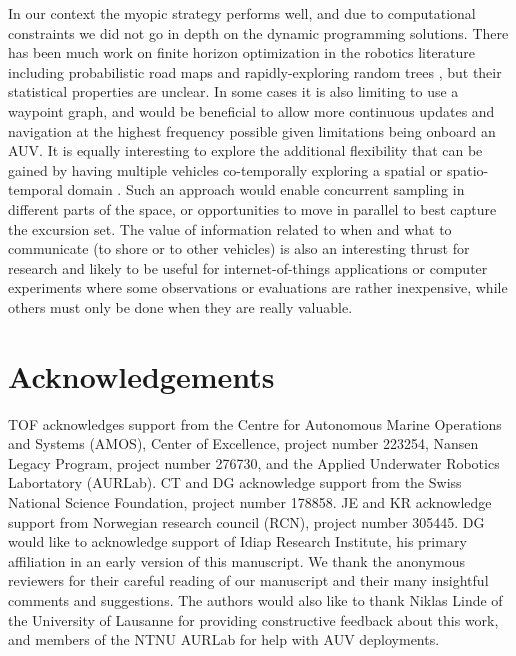 \documentclass[aoas]{imsart}
\begin{document}
In our context the myopic strategy performs well, and due to
computational constraints we did not go in depth on the dynamic
programming solutions. There has been much work on finite horizon
optimization in the robotics literature including probabilistic road
maps and rapidly-exploring random trees \citep{karaman2011sampling},
but their statistical properties are unclear.  In some cases it is
also limiting to use a waypoint graph, and would be beneficial to
allow more continuous updates and navigation at the highest frequency
possible given limitations being onboard an AUV.  It is equally
interesting to explore the additional flexibility that can be gained
by having multiple vehicles co-temporally exploring a spatial or
spatio-temporal domain \citep{ferreira2019advancing}. Such an approach
would enable concurrent sampling in different parts of the space, or
opportunities to move in parallel to best capture the excursion set.
The value of information related to when and what to communicate (to
shore or to other vehicles) is also an interesting thrust for research
and likely to be useful for internet-of-things applications or
computer experiments where some observations or evaluations are rather
inexpensive, while others must only be done when they are really
valuable.


\section*{Acknowledgements}

TOF acknowledges support from the Centre for Autonomous Marine
Operations and Systems (AMOS), Center of Excellence, project number
223254, Nansen Legacy Program, project number 276730, and the Applied
Underwater Robotics Labortatory (AURLab). CT and DG acknowledge
support from the Swiss National Science Foundation, project number
178858. JE and KR acknowledge support from Norwegian research council
(RCN), project number 305445. DG would like to acknowledge support of
Idiap Research Institute, his primary affiliation in an early version
of this manuscript. We thank the anonymous reviewers for their careful
reading of our manuscript and their many insightful comments and
suggestions. The authors would also like to thank Niklas Linde of the
University of Lausanne for providing constructive feedback about this
work, and members of the NTNU AURLab for help with AUV deployments.

\begin{supplement}
\end{supplement}

\footnotesize



% 
\end{document}
